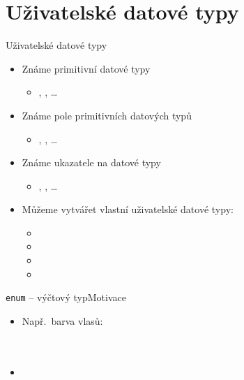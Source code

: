 \section{Uživatelské datové typy}
\frame{\sectionpage}

\begin{frame}{Uživatelské datové typy}

  \begin{itemize}
    \item Známe primitivní datové typy
    \begin{itemize}
      \item {}, , \dots
    \end{itemize}

    \pause

    \item Známe pole primitivních datových typů
    \begin{itemize}
      \item {}, , \dots
    \end{itemize}

    \pause

    \item Známe ukazatele na datové typy
    \begin{itemize}
      \item {}, , \dots
    \end{itemize}

    \pause

    \item Můžeme vytvářet vlastní uživatelské datové typy:
    \begin{itemize}
      \item {}
      \item {}
      \item {}
      \item {}
    \end{itemize}

  \end{itemize}

\end{frame}

\begin{frame}[fragile]{\texttt{enum} -- výčtový typ}{Motivace}

  \begin{itemize}
    \item Např.\ barva vlasů: \\
       \\
       \\

    \pause

    \item {}

  \end{itemize}

\end{frame}

